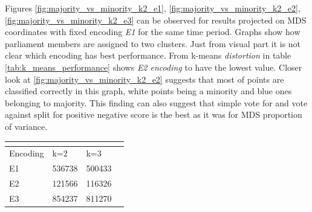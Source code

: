\documentclass[a4paper,12pt]{article}
\begin{document}
	Figures \ref{fig:majority_vs_minority_k2_e1}, \ref{fig:majority_vs_minority_k2_e2}, \ref{fig:majority_vs_minority_k2_e3} can be observed for results projected on MDS coordinates with fixed encoding \textit{E1} for the same time period. Graphs show how parliament members are assigned to two clusters. Just from visual part it is not clear which encoding has best performance. From \Gls{k-means} \textit{distortion} in table \ref{tab:k_means_performance} shows \textit{E2 encoding} to have the lowest value. Closer look at \ref{fig:majority_vs_minority_k2_e2} suggests that most of points are classified correctly in this graph, white points being a minority and blue ones belonging to majority. This finding can also suggest that simple vote for and vote against split for positive negative score is the best as it was for MDS proportion of variance.
	
	
	\noindent
	\begin{center}
		\begin{tabular}{L{3cm} C{2cm} C{2cm} C{2cm}}
			\\ 
			\hline
			Encoding & k=2 & k=3 \\\hline
			E1 & 536738 & 500433 \\
			E2 & 121566 & 116326 \\
			E3 & 854237 & 811270 \\
			\hline
		\end{tabular}
		 \label{tab:k_means_performance}
	\end{center} 
	
\end{document}
